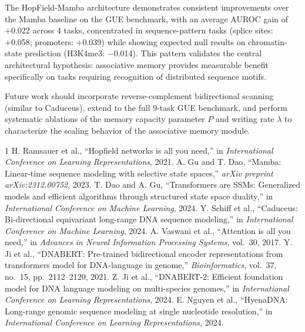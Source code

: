 \documentclass[journal,10pt]{IEEEtran}
\begin{document}
The HopField-Mamba architecture demonstrates consistent improvements over the Mamba baseline on the GUE benchmark, with an average AUROC gain of +0.022 across 4 tasks, concentrated in sequence-pattern tasks (splice sites: +0.058; promoters: +0.039) while showing expected null results on chromatin-state prediction (H3K4me3: $-$0.014). This pattern validates the central architectural hypothesis: associative memory provides measurable benefit specifically on tasks requiring recognition of distributed sequence motifs.

Future work should incorporate reverse-complement bidirectional scanning (similar to Caduceus), extend to the full 9-task GUE benchmark, and perform systematic ablations of the memory capacity parameter $P$ and writing rate $\lambda$ to characterize the scaling behavior of the associative memory module.


\begin{thebibliography}{1}
H. Ramsauer et al., ``Hopfield networks is all you need,'' in \emph{International Conference on Learning Representations}, 2021.
A. Gu and T. Dao, ``Mamba: Linear-time sequence modeling with selective state spaces,'' \emph{arXiv preprint arXiv:2312.00752}, 2023.
T. Dao and A. Gu, ``Transformers are SSMs: Generalized models and efficient algorithms through structured state space duality,'' in \emph{International Conference on Machine Learning}, 2024.
Y. Schiff et al., ``Caduceus: Bi-directional equivariant long-range DNA sequence modeling,'' in \emph{International Conference on Machine Learning}, 2024.
A. Vaswani et al., ``Attention is all you need,'' in \emph{Advances in Neural Information Processing Systems}, vol.~30, 2017.
Y. Ji et al., ``DNABERT: Pre-trained bidirectional encoder representations from transformers model for DNA-language in genome,'' \emph{Bioinformatics}, vol.~37, no.~15, pp.~2112--2120, 2021.
Z. Ji et al., ``DNABERT-2: Efficient foundation model for DNA language modeling on multi-species genomes,'' in \emph{International Conference on Learning Representations}, 2024.
E. Nguyen et al., ``HyenaDNA: Long-range genomic sequence modeling at single nucleotide resolution,'' in \emph{International Conference on Learning Representations}, 2024.
\end{thebibliography}
\end{document}
